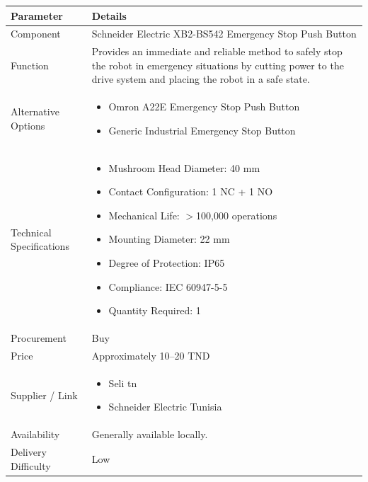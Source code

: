 \documentclass[12pt,a4paper]{article}
\begin{document}
\begin{longtable}{|p{4cm}|p{10cm}|}
\hline
\textbf{Parameter} & \textbf{Details} \\
\hline

Component &
Schneider Electric XB2-BS542 Emergency Stop Push Button \\
\hline

Function &
Provides an immediate and reliable method to safely stop the robot in emergency situations by cutting power to the drive system and placing the robot in a safe state. \\
\hline


Alternative Options &
\begin{itemize}
\item Omron A22E Emergency Stop Push Button
\item Generic Industrial Emergency Stop Button
\end{itemize}
\\
\hline

Technical Specifications &
\begin{itemize}
\item Mushroom Head Diameter: 40 mm
\item Contact Configuration: 1 NC + 1 NO
\item Mechanical Life: $>$100,000 operations
\item Mounting Diameter: 22 mm
\item Degree of Protection: IP65
\item Compliance: IEC 60947-5-5
\item Quantity Required: 1 
\end{itemize}
\\
\hline

Procurement &
Buy \\
\hline

Price &
Approximately 10--20 TND \\
\hline

Supplier / Link &
\begin{itemize}
\item Seli tn
\item Schneider Electric Tunisia

\end{itemize}
\\
\hline

Availability &
Generally available locally. \\
\hline

Delivery Difficulty &
Low \\
\hline


\end{longtable}
\end{document}
